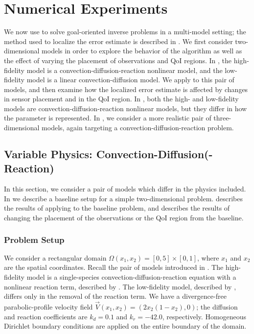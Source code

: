 \documentclass[review,sort&compress]{elsarticle}
\begin{document}
\section{Numerical Experiments}\label{sec:numexp}
%
We now use  to solve goal-oriented inverse problems in a multi-model setting; the method used to localize the error estimate is described in . We first consider two-dimensional models in order to explore the behavior of the algorithm as well as the effect of varying the placement of observations and QoI regions. In , the high-fidelity model is a convection-diffusion-reaction nonlinear model, and the low-fidelity model is a linear convection-diffusion model. We apply  to this pair of models, and then examine how the localized error estimate is affected by changes in sensor placement and in the QoI region. In , both the high- and low-fidelity models are convection-diffusion-reaction nonlinear models, but they differ in how the parameter is represented. In , we consider a more realistic pair of three-dimensional models, again targeting a convection-diffusion-reaction problem.

\subsection{Variable Physics: Convection-Diffusion(-Reaction)} \label{sec:cdvcdr}
In this section, we consider a pair of models which differ in the physics included. In  we describe a baseline setup for a simple two-dimensional problem.  describes the results of applying  to the baseline problem, and  describes the results of changing the placement of the observations or the QoI region from the baseline.
%
\subsubsection{Problem Setup} \label{sec:cdvcdrSetup}
%
We consider a rectangular domain $\Omega(x_1,x_2)=[0,5]\times[0,1]$, where $x_1$ and $x_2$ are the spatial coordinates. Recall the pair of models introduced in . The high-fidelity model is a single-species convection-diffusion-reaction equation with a nonlinear reaction term, described by . The low-fidelity model, described by , differs only in the removal of the reaction term. We have a divergence-free parabolic-profile velocity field $\vec{V}(x_1,x_2) = (2x_2(1-x_2),0)$; the diffusion and reaction coefficients are $k_d = 0.1$ and $k_r = -42.0$, respectively. Homogeneous Dirichlet boundary conditions are applied on the entire boundary of the domain. 
\end{document}
